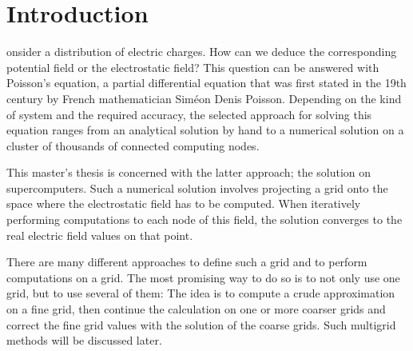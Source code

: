 %
%


\let\textcircled=\pgftextcircled
\chapter{Introduction}
\label{chap:intro}

onsider a distribution of electric charges. How can we deduce the corresponding potential field or the electrostatic field? This question can be answered with Poisson's equation, a partial differential equation that was first stated in the 19th century by French mathematician Siméon Denis Poisson. Depending on the kind of system and the required accuracy, the selected approach for solving this equation ranges from an analytical solution by hand to a numerical solution on a cluster of thousands of connected computing nodes. 

This master's thesis is concerned with the latter approach; the solution on supercomputers. Such a numerical solution involves projecting a grid onto the space where the electrostatic field has to be computed. When iteratively performing computations to each node of this field, the solution converges to the real electric field values on that point. 

There are many different approaches to define such a grid and to perform computations on a grid. The most promising way to do so is to not only use one grid, but to use several of them: The idea is to compute a crude approximation on a fine grid, then continue the calculation on one or more coarser grids and correct the fine grid values with the solution of the coarse grids. Such multigrid methods will be discussed later. 

